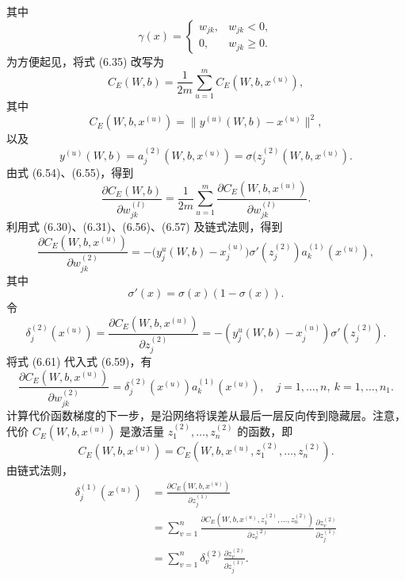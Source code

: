其中
\[
\gamma(x)=\begin{cases}w_{jk},&w_{jk}<0,\\0,&w_{jk}\geq0.\end{cases}
\]
为方便起见，将式 (6.35) 改写为
\begin{equation}
C_E(W,b)=\frac1{2m}\sum_{u=1}^m C_E(W,b,x^{(u)}),
\tag{6.55}
\end{equation}
其中
\begin{equation}
C_E(W,b,x^{(u)})=\lVert y^{(u)}(W,b)-x^{(u)}\rVert^2,
\tag{6.56}
\end{equation}
以及
\begin{equation}
y^{(u)}(W,b)=a_j^{(2)}(W,b,x^{(u)})=\sigma\bigl(z_j^{(2)}(W,b,x^{(u)}).
\tag{6.57}
\end{equation}
由式 (6.54)、(6.55)，得到
\begin{equation}
\frac{\partial C_E(W,b)}{\partial w_{jk}^{(l)}}=\frac1{2m}\sum_{u=1}^m\frac{\partial C_E(W,b,x^{(u)})}{\partial w_{jk}^{(l)}}.
\tag{6.58}
\end{equation}
利用式 (6.30)、(6.31)、(6.56)、(6.57) 及链式法则，得到
\begin{equation}
\frac{\partial C_E(W,b,x^{(u)})}{\partial w_{jk}^{(2)}}=
-\bigl(y_j^u(W,b)-x_j^{(u)}\bigr)\sigma'(z_j^{(2)})a_k^{(1)}(x^{(u)}),
\tag{6.59}
\end{equation}
其中
\begin{equation}
\sigma'(x)=\sigma(x)(1-\sigma(x)).
\tag{6.60}
\end{equation}
令
\begin{equation}
\delta_j^{(2)}(x^{(u)})=\frac{\partial C_E(W,b,x^{(u)})}{\partial z_j^{(2)}}=
-(y_j^u(W,b)-x_j^{(u)})\sigma'(z_j^{(2)}).
\tag{6.61}
\end{equation}
将式 (6.61) 代入式 (6.59)，有
\begin{equation}
\frac{\partial C_E(W,b,x^{(u)})}{\partial w_{jk}^{(2)}}=\delta_j^{(2)}(x^{(u)})a_k^{(1)}(x^{(u)}),\quad j=1,\ldots,n,\ k=1,\ldots,n_1.
\tag{6.62}
\end{equation}
计算代价函数梯度的下一步，是沿网络将误差从最后一层反向传到隐藏层。注意，代价 $C_E(W,b,x^{(u)})$ 是激活量 $z_1^{(2)},\ldots,z_n^{(2)}$ 的函数，即
\begin{equation}
C_E(W,b,x^{(u)})=C_E(W,b,x^{(u)},z_1^{(2)},\ldots,z_n^{(2)}).
\tag{6.63}
\end{equation}
由链式法则，
\begin{equation}
\begin{aligned}
\delta_j^{(1)}(x^{(u)})&=\frac{\partial C_E(W,b,x^{(u)})}{\partial z_j^{(1)}}\\
&=\sum_{v=1}^n\frac{\partial C_E(W,b,x^{(u)},z_1^{(2)},\ldots,z_n^{(2)})}{\partial z_v^{(2)}}\frac{\partial z_v^{(2)}}{\partial z_j^{(1)}}\\
&=\sum_{v=1}^n\delta_v^{(2)}\frac{\partial z_v^{(2)}}{\partial z_j^{(1)}}.
\end{aligned}\tag{6.64}
\end{equation}

